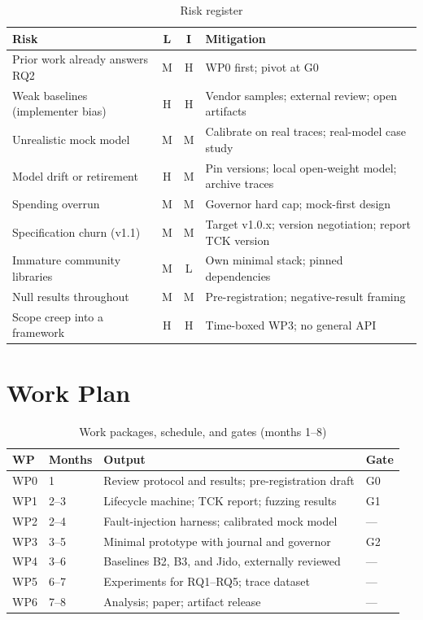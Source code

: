 \documentclass[conference,letterpaper]{IEEEtran}
\begin{document}
\begin{table}[!h]
\centering
\caption{Risk register}
\label{tab:risk}
\footnotesize
\renewcommand{\arraystretch}{1.12}
\begin{tabularx}{\textwidth}{@{}P{5.2cm}ccY@{}}
\toprule
\textbf{Risk} & \textbf{L} & \textbf{I} & \textbf{Mitigation} \\
\midrule
Prior work already answers RQ2 & M & H & WP0 first; pivot at G0 \\
Weak baselines (implementer bias) & H & H & Vendor samples; external
 review; open artifacts \\
Unrealistic mock model & M & M & Calibrate on real traces; real-model
 case study \\
Model drift or retirement & H & M & Pin versions; local open-weight model;
 archive traces \\
Spending overrun & M & M & Governor hard cap; mock-first design \\
Specification churn (v1.1) & M & M & Target v1.0.x; version negotiation;
 report TCK version \\
Immature community libraries & M & L & Own minimal stack; pinned
 dependencies \\
Null results throughout & M & M & Pre-registration; negative-result
 framing \\
Scope creep into a framework & H & H & Time-boxed WP3; no general API \\
\bottomrule
\end{tabularx}
\end{table}

\section{Work Plan}\label{app:plan}

\begin{table}[!h]
\centering
\caption{Work packages, schedule, and gates (months 1--8)}
\label{tab:plan}
\footnotesize
\renewcommand{\arraystretch}{1.12}
\begin{tabularx}{\textwidth}{@{}P{1.0cm}P{1.4cm}YP{1.0cm}@{}}
\toprule
\textbf{WP} & \textbf{Months} & \textbf{Output} & \textbf{Gate} \\
\midrule
WP0 & 1 & Review protocol and results; pre-registration draft & G0 \\
WP1 & 2--3 & Lifecycle machine; TCK report; fuzzing results & G1 \\
WP2 & 2--4 & Fault-injection harness; calibrated mock model & --- \\
WP3 & 3--5 & Minimal prototype with journal and governor & G2 \\
WP4 & 3--6 & Baselines B2, B3, and Jido, externally reviewed & --- \\
WP5 & 6--7 & Experiments for RQ1--RQ5; trace dataset & --- \\
WP6 & 7--8 & Analysis; paper; artifact release & --- \\
\bottomrule
\end{tabularx}
\end{table}
\end{document}
